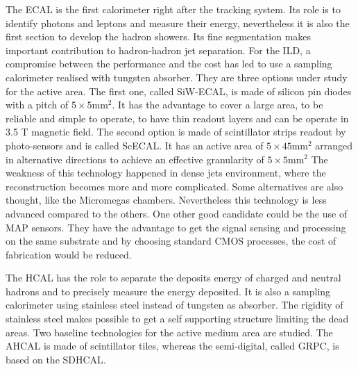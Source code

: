       The \gls{ECAL} is the first calorimeter right after the tracking system.
      Its role is to identify photons and leptons and measure their energy, nevertheless it is also the first section to develop the hadron showers.
      Its fine segmentation makes important contribution to hadron-hadron jet separation.
      For the \gls{ILD}, a compromise between the performance and the cost has led to use a sampling calorimeter realised with tungsten absorber.
      They are three options under study for the active area.
      The first one, called SiW-ECAL, is made of silicon pin diodes with a pitch of $5 \times 5 \text{mm}^2$. 
      It has the advantage to cover a large area, to be reliable and simple to operate, to have thin readout layers and can be operate in 3.5 T magnetic field.
      The second option is made of scintillator strips readout by photo-sensors and is called ScECAL.
      It has an active area of $5 \times 45 \text{mm}^2$ arranged in alternative directions to achieve an effective granularity of $5 \times 5 \text{mm}^2$ 
      The weakness of this technology happened in dense jets environment, where the reconstruction becomes more and more complicated.
      Some alternatives are also thought, like the Micromegas chambers. Nevertheless this technology is less advanced compared to the others.
      One other good candidate could be the use of \gls{MAP} sensors.
      They have the advantage to get the signal sensing and processing on the same  substrate and by choosing standard CMOS processes, the cost of fabrication would be reduced.

      The  \gls{HCAL} has the role to separate the deposits energy of charged and neutral hadrons and to precisely measure the energy deposited.
      It is also a sampling calorimeter using stainless steel instead of tungsten as absorber. 
      The rigidity of stainless steel makes possible to get a self supporting structure limiting the dead areas.
      Two baseline technologies for the active medium area are studied.
      The  \gls{AHCAL} is made of scintillator tiles, whereas the semi-digital, called \gls{GRPC}, is based on the \gls{SDHCAL}.

